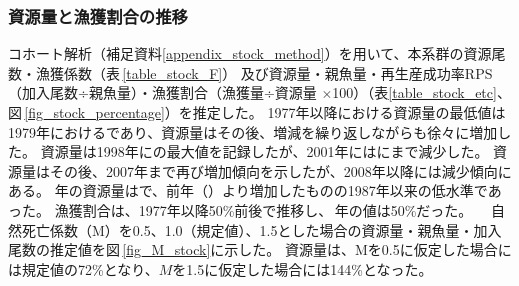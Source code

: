 \subsubsection{資源量と漁獲割合の推移}
コホート解析（補足資料\ref{appendix_stock_method}）を用いて、本系群の資源尾数・漁獲係数（表\,\ref{table_stock_F}）
及び資源量・親魚量・再生産成功率RPS（加入尾数÷親魚量）・漁獲割合（漁獲量÷資源量 $\times$100）（表\ref{table_stock_etc}、図\,\ref{fig_stock_percentage}）を推定した。
1977年以降における資源量の最低値は1979年における\makeatletter{}\makeatother であり、資源量はその後、増減を繰り返しながらも徐々に増加した。
資源量は1998年に\makeatletter{}\makeatother の最大値を記録したが、2001年には\makeatletter{}\makeatother にまで減少した。
資源量はその後、2007年まで再び増加傾向を示したが、2008年以降には減少傾向にある。
{\ThisYr}年の資源量は\makeatletter{}\makeatother で、前年（\makeatletter{}\makeatother ）より増加したものの1987年以来の低水準であった。
漁獲割合は、1977年以降\textcolor[cmyk]{0,1,0,0}{50\%}前後で推移し、{\ThisYr}\,年の値は\textcolor[cmyk]{0,1,0,0}{50\%}だった。
　自然死亡係数（M）を0.5、1.0（規定値）、1.5とした場合の資源量・親魚量・加入尾数の推定値を図\,\ref{fig_M_stock}に示した。
資源量は、Mを0.5に仮定した場合には規定値の\textcolor[cmyk]{0,1,0,0}{72\%}となり、$M$を1.5に仮定した場合には\textcolor[cmyk]{0,1,0,0}{144\%}となった。
